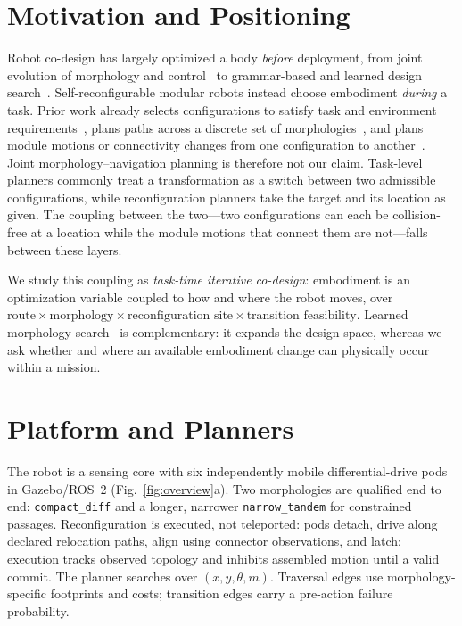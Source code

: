 \documentclass[conference]{IEEEtran}
\begin{document}
\section{Motivation and Positioning}
Robot co-design has largely optimized a body \emph{before} deployment, from joint evolution of morphology and control~\cite{sims1994} to grammar-based and learned design search~\cite{zhao2020robogrammar,strgar2024evolution}. Self-reconfigurable modular robots instead choose embodiment \emph{during} a task. Prior work already selects configurations to satisfy task and environment requirements~\cite{jing2016smores,daudelin2018smores}, plans paths across a discrete set of morphologies~\cite{le2018htetro}, and plans module motions or connectivity changes from one configuration to another~\cite{yoshida2002,liu2019smores}. Joint morphology--navigation planning is therefore not our claim. Task-level planners commonly treat a transformation as a switch between two admissible configurations, while reconfiguration planners take the target and its location as given. The coupling between the two---two configurations can each be collision-free at a location while the module motions that connect them are not---falls between these layers.

We study this coupling as \emph{task-time iterative co-design}: embodiment is an optimization variable coupled to how and where the robot moves, over
\(\text{route} \times \text{morphology} \times \text{reconfiguration site} \times \text{transition feasibility}\).
Learned morphology search~\cite{zhao2020robogrammar,strgar2024evolution} is complementary: it expands the design space, whereas we ask whether and where an available embodiment change can physically occur within a mission.

\section{Platform and Planners}
The robot is a sensing core with six independently mobile differential-drive pods in Gazebo/ROS~2 (Fig.~\ref{fig:overview}a). Two morphologies are qualified end to end: \texttt{compact\_diff} and a longer, narrower \texttt{narrow\_tandem} for constrained passages. Reconfiguration is executed, not teleported: pods detach, drive along declared relocation paths, align using connector observations, and latch; execution tracks observed topology and inhibits assembled motion until a valid commit. The planner searches over \((x, y, \theta, m)\). Traversal edges use morphology-specific footprints and costs; transition edges carry a pre-action failure probability.
\end{document}
